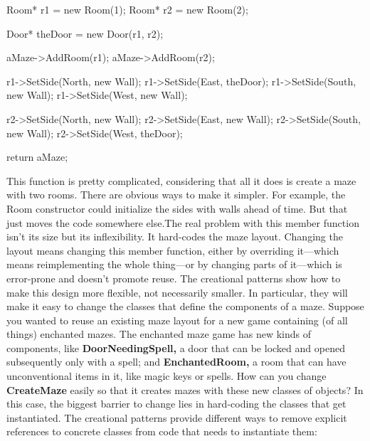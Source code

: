 \documentclass{report}
\begin{document}
\begin{itemize}
\begin{cppcode}
{                    Room* r1 = new Room(1);
                    Room* r2 = new Room(2);

                    Door* theDoor = new Door(r1, r2);

                    aMaze->AddRoom(r1);
                    aMaze->AddRoom(r2);

                    r1->SetSide(North, new Wall);
                    r1->SetSide(East, theDoor);
                    r1->SetSide(South, new Wall);
                    r1->SetSide(West, new Wall);

                    r2->SetSide(North, new Wall);
                    r2->SetSide(East, new Wall);
                    r2->SetSide(South, new Wall);
                    r2->SetSide(West, theDoor);

                    return aMaze;
                }
            \end{cppcode}
            \bigbreak \noindent 
            This function is pretty complicated, considering that all it does is create a maze with two rooms. There are obvious ways to make it simpler. For example, the Room constructor could initialize the sides with walls ahead of time. But that just
            \bigbreak \noindent 
            moves the code somewhere else.The real problem with this member function isn't its size but its inflexibility. It hard-codes the maze layout. Changing the layout means changing this member function, either by overriding it—which means reimplementing the whole thing—or by changing parts of it—which is error-prone and doesn't promote reuse.
            \bigbreak \noindent 
            The creational patterns show how to make this design more flexible, not necessarily smaller. In particular, they will make it easy to change the classes that define the components of a maze.
            \bigbreak \noindent 
            Suppose you wanted to reuse an existing maze layout for a new game containing (of all things) enchanted mazes. The enchanted maze game has new kinds of components, like \textbf{DoorNeedingSpell,} a door that can be locked and opened subsequently only with a spell; and \textbf{EnchantedRoom,} a room that can have unconventional items in it, like magic keys or spells. How can you change \textbf{CreateMaze} easily so that it creates mazes with these new classes of objects?
            \bigbreak \noindent 
            In this case, the biggest barrier to change lies in hard-coding the classes that get instantiated. The creational patterns provide different ways to remove explicit references to concrete classes from code that needs to instantiate them:

\end{itemize}
\end{document}
